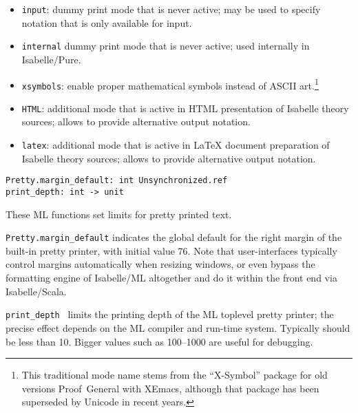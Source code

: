 \begin{isabellebody}
\begin{isamarkuptext}
\begin{itemize}
  \item \verb|input|: dummy print mode that is never active; may
  be used to specify notation that is only available for input.

  \item \verb|internal| dummy print mode that is never active;
  used internally in Isabelle/Pure.

  \item \verb|xsymbols|: enable proper mathematical symbols
  instead of ASCII art.\footnote{This traditional mode name stems from
  the ``X-Symbol'' package for old versions Proof~General with XEmacs,
  although that package has been superseded by Unicode in recent
  years.}

  \item \verb|HTML|: additional mode that is active in HTML
  presentation of Isabelle theory sources; allows to provide
  alternative output notation.

  \item \verb|latex|: additional mode that is active in {\LaTeX}
  document preparation of Isabelle theory sources; allows to provide
  alternative output notation.

  \end{itemize}%
\end{isamarkuptext}%
\isamarkuptrue%
%
\isamarkuptrue%
%
\begin{isamarkuptext}%
\begin{mldecls}
    \verb|Pretty.margin_default: int Unsynchronized.ref| \\
    \verb|print_depth: int -> unit| \\
  \end{mldecls}

  These ML functions set limits for pretty printed text.

  \begin{description}

  \item \verb|Pretty.margin_default| indicates the global default for
  the right margin of the built-in pretty printer, with initial value
  76.  Note that user-interfaces typically control margins
  automatically when resizing windows, or even bypass the formatting
  engine of Isabelle/ML altogether and do it within the front end via
  Isabelle/Scala.

  \item \verb|print_depth|~ limits the printing depth of the
  ML toplevel pretty printer; the precise effect depends on the ML
  compiler and run-time system.  Typically  should be less
  than 10.  Bigger values such as 100--1000 are useful for debugging.


\end{description}
\end{isamarkuptext}
\end{isabellebody}
